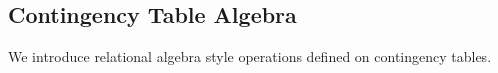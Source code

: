 \documentclass{vldb}
\newcommand{\ct}{\mathit{ct}}
\begin{document}
\subsection{Contingency Table Algebra} \label{sec:cta}

We introduce relational algebra style operations defined on contingency tables.

\end{document}
